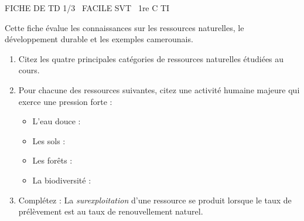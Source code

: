 \documentclass[11pt]{article}
\begin{document}
\begin{tcolorbox}[enhanced,colback=popink,colframe=popink,arc=10pt,boxrule=0pt,left=12pt,right=12pt,top=9pt,bottom=9pt]
{\color{white}\popxbold\small FICHE DE TD 1/3 \textbullet\ FACILE \hfill SVT \textbullet\ 1re C TI\par}
\end{tcolorbox}
\vspace{4pt}
Cette fiche évalue les connaissances sur les ressources naturelles, le développement durable et les exemples camerounais.

\begin{exercice}
\begin{enumerate}
    \item Citez les quatre principales catégories de ressources naturelles étudiées au cours.
    \item Pour chacune des ressources suivantes, citez une activité humaine majeure qui exerce une pression forte :
    \begin{itemize}
        \item L'eau douce :
        \item Les sols :
        \item Les forêts :
        \item La biodiversité :
    \end{itemize}
    \item Complétez : La \textit{surexploitation} d'une ressource se produit lorsque le taux de prélèvement est \underline{\hspace{4cm}} au taux de renouvellement naturel.
\end{enumerate}
\end{exercice}
\end{document}
